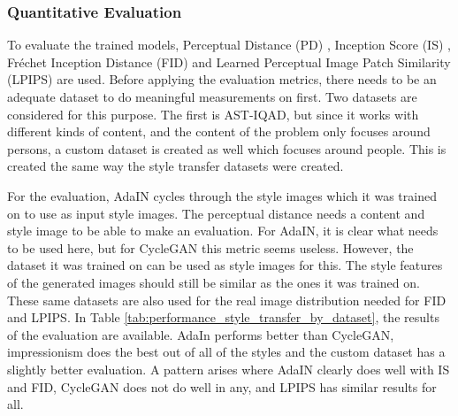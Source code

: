 \documentclass[conference]{IEEEtran}
\begin{document}
\subsubsection{Quantitative Evaluation}
To evaluate the trained models, Perceptual Distance (PD) \cite{Johnson2016}, Inception Score (IS) \cite{Salimans2016}, Fréchet Inception Distance (FID) \cite{Heusel2017} and Learned Perceptual Image Patch Similarity (LPIPS) \cite{Zhang2018} are used.
Before applying the evaluation metrics, there needs to be an adequate dataset to do meaningful measurements on first.
Two datasets are considered for this purpose.
The first is AST-IQAD, but since it works with different kinds of content, and the content of the problem only focuses around persons, a custom dataset is created as well which focuses around people.
This is created the same way the style transfer datasets were created.

For the evaluation, AdaIN cycles through the style images which it was trained on to use as input style images.
The perceptual distance needs a content and style image to be able to make an evaluation.
For AdaIN, it is clear what needs to be used here, but for CycleGAN this metric seems useless.
However, the dataset it was trained on can be used as style images for this.
The style features of the generated images should still be similar as the ones it was trained on.
These same datasets are also used for the real image distribution needed for FID and LPIPS.
In Table \ref{tab:performance_style_transfer_by_dataset}, the results of the evaluation are available.
AdaIn performs better than CycleGAN, impressionism does the best out of all of the styles and the custom dataset has a slightly better evaluation.
A pattern arises where AdaIN clearly does well with IS and FID, CycleGAN does not do well in any, and LPIPS has similar results for all.
\end{document}
